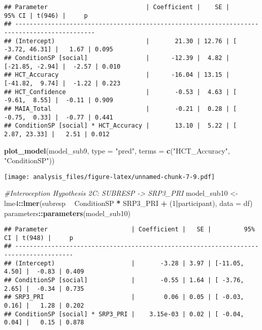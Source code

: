 \documentclass[
]{article}
\newenvironment{Shaded}{\begin{snugshade}}{\end{snugshade}}
\newcommand{\CommentTok}[1]{\textcolor[rgb]{0.56,0.35,0.01}{\textit{#1}}}
\newcommand{\DataTypeTok}[1]{\textcolor[rgb]{0.13,0.29,0.53}{#1}}
\newcommand{\DecValTok}[1]{\textcolor[rgb]{0.00,0.00,0.81}{#1}}
\newcommand{\KeywordTok}[1]{\textcolor[rgb]{0.13,0.29,0.53}{\textbf{#1}}}
\newcommand{\NormalTok}[1]{#1}
\newcommand{\OperatorTok}[1]{\textcolor[rgb]{0.81,0.36,0.00}{\textbf{#1}}}
\newcommand{\StringTok}[1]{\textcolor[rgb]{0.31,0.60,0.02}{#1}}
\begin{document}
\begin{verbatim}
## Parameter                           | Coefficient |    SE |          95% CI | t(946) |     p
## --------------------------------------------------------------------------------------------
## (Intercept)                         |       21.30 | 12.76 | [ -3.72, 46.31] |   1.67 | 0.095
## ConditionSP [social]                |      -12.39 |  4.82 | [-21.85, -2.94] |  -2.57 | 0.010
## HCT_Accuracy                        |      -16.04 | 13.15 | [-41.82,  9.74] |  -1.22 | 0.223
## HCT_Confidence                      |       -0.53 |  4.63 | [ -9.61,  8.55] |  -0.11 | 0.909
## MAIA_Total                          |       -0.21 |  0.28 | [ -0.75,  0.33] |  -0.77 | 0.441
## ConditionSP [social] * HCT_Accuracy |       13.10 |  5.22 | [  2.87, 23.33] |   2.51 | 0.012
\end{verbatim}

\begin{Shaded}
\begin{Highlighting}[]
\KeywordTok{plot_model}\NormalTok{(model_sub9, }\DataTypeTok{type =} \StringTok{"pred"}\NormalTok{, }\DataTypeTok{terms =} \KeywordTok{c}\NormalTok{(}\StringTok{"HCT_Accuracy"}\NormalTok{, }\StringTok{"ConditionSP"}\NormalTok{))}
\end{Highlighting}
\end{Shaded}

\texttt{[image: analysis\_files/figure-latex/unnamed-chunk-7-9.pdf]}

\begin{Shaded}
\begin{Highlighting}[]
\CommentTok{#Interoception Hypothesis 2C: SUBRESP -> SRP3_PRI}
\NormalTok{model_sub10 <-}\StringTok{ }\NormalTok{lme4}\OperatorTok{::}\KeywordTok{lmer}\NormalTok{(subresp }\OperatorTok{~}\StringTok{ }\NormalTok{ConditionSP }\OperatorTok{*}\StringTok{ }\NormalTok{SRP3_PRI }\OperatorTok{+}\StringTok{ }\NormalTok{(}\DecValTok{1}\OperatorTok{|}\NormalTok{participant), }\DataTypeTok{data =}\NormalTok{ df)}
\NormalTok{parameters}\OperatorTok{::}\KeywordTok{parameters}\NormalTok{(model_sub10)}
\end{Highlighting}
\end{Shaded}

\begin{verbatim}
## Parameter                       | Coefficient |   SE |         95% CI | t(948) |     p
## --------------------------------------------------------------------------------------
## (Intercept)                     |       -3.28 | 3.97 | [-11.05, 4.50] |  -0.83 | 0.409
## ConditionSP [social]            |       -0.55 | 1.64 | [ -3.76, 2.65] |  -0.34 | 0.735
## SRP3_PRI                        |        0.06 | 0.05 | [ -0.03, 0.16] |   1.28 | 0.202
## ConditionSP [social] * SRP3_PRI |    3.15e-03 | 0.02 | [ -0.04, 0.04] |   0.15 | 0.878
\end{verbatim}
\end{document}
